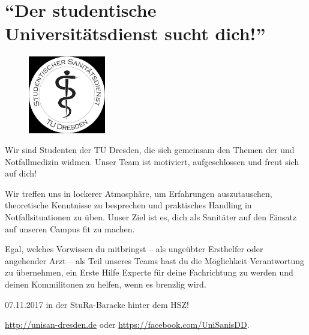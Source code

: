 \section*{\enquote{Der studentische Universitätsdienst sucht dich!}}

\begin{figure}%
  \includegraphics[width=0.3\textwidth]{./unisan-logo-gray.jpg}
\end{figure}
   Wir sind Studenten der TU Dresden, die sich gemeinsam den
    Themen der  und Notfallmedizin widmen. Unser Team ist
motiviert, aufgeschlossen und freut sich auf dich!

 Wir treffen uns in lockerer Atmosphäre, um Erfahrungen
auszutauschen, theoretische Kenntnisse zu besprechen und praktisches
Handling in Notfallsituationen zu üben. Unser Ziel ist es, dich als
Sanitäter auf den Einsatz auf unseren Campus fit zu machen.

   Egal, welches Vorwissen du mitbringst -- als ungeübter
Ersthelfer oder angehender Arzt -- als Teil unseres Teams hast du die
Möglichkeit Verantwortung zu übernehmen, ein Erste Hilfe Experte für
deine Fachrichtung zu werden und deinen Kommilitonen zu helfen, wenn es
brenzlig wird.

 07.11.2017 in der StuRa-Baracke hinter dem HSZ!

 \url{http://unisan-dresden.de} oder \url{https://facebook.com/UniSanisDD}.
